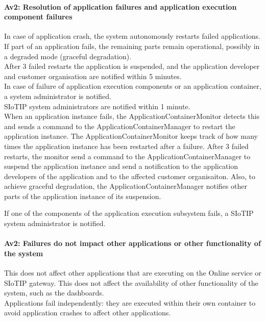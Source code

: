     \paragraph{Av2: Resolution of application failures and application execution component failures}
        In case of application crash, the system autonomously restarts failed applications.
        If part of an application fails, the remaining parts remain operational,
        possibly in a degraded mode (graceful degradation). \\
        After 3 failed restarts the application is suspended, and the
        application developer and customer organisation are notified within 5 minutes.\\

        In case of failure of application execution components or an application
        container, a system administrator is notified. \\
        SIoTIP system administrators are notified within 1 minute.\\

        When an application instance fails, the ApplicationContainerMonitor detects this and
        sends a command to the ApplicationContainerManager to restart the application instance.
        The ApplicationContainerMonitor keeps track of how many times the
        application instance has been restarted after a failure. After 3 failed restarts, the monitor
        send a command to the ApplicationContainerManager to suspend the application instance and send
        a notification to the application developers of the application and to the
        affected customer organisaiton. Also, to achieve graceful degradation,
        the ApplicationContainerManager notifies other parts of the application instance
        of its suspension.

        If one of the components of the application execution subsystem fails,
        a SIoTIP system administrator is notified.


    \paragraph{Av2: Failures do not impact other applications or other functionality of the system}
        This does not affect other applications that are executing on the Online
        service or SIoTIP gateway. This does not affect the availability of
        other functionality of the system, such as the dashboards. \\
        Applications fail independently: they are executed within their own
        container to avoid application crashes to affect other applications.\\

